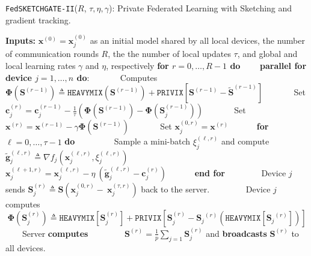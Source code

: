 
\begin{algorithm}[H]
\caption{\texttt{FedSKETCHGATE-II}($R$, $\tau, \eta, \gamma$): Private Federated Learning with Sketching and gradient tracking. }\label{Alg:PFLHet}
\begin{algorithmic}[1]
\State \textbf{Inputs:} $\boldsymbol{x}^{(0)}=\boldsymbol{x}^{(0)}_j$ as an initial  model shared by all local devices, the number of communication rounds $R$, the the number of local updates $\tau$, and global and local learning rates $\gamma$ and $\eta$, respectively
\State \textbf{for $r=0, \ldots, R-1$ do}
\State $\qquad$\textbf{parallel for device $j=1,\ldots,n$ do}:
\State $\qquad\quad$ Computes ${\mathbf{\Phi}}(\mathbf{S}^{(r-1)})\triangleq \texttt{HEAVYMIX}(\mathbf{S}^{(r-1)})+\texttt{PRIVIX}\left[{\mathbf{S}}^{(r-1)}- \tilde{\mathbf{S}}^{(r-1)}\right]$
\State $\qquad\quad$ Set $\mathbf{c}_j^{(r)}=\mathbf{c}_j^{(r-1)}-\frac{1}{\tau}\left(\mathbf{\Phi}\left(\mathbf{S}^{(r-1)}\right)-\mathbf{\Phi}\left(\mathbf{S}^{(r-1)}_{j}\right)\right)$
\State $\qquad\quad$ Set $\boldsymbol{x}^{(r)}=\boldsymbol{x}^{(r-1)}-\gamma\mathbf{\Phi}\left(\mathbf{S}^{(r-1)}\right)$
\State $\qquad\quad$ Set $\boldsymbol{x}_j^{(0,r)}=\boldsymbol{x}^{(r)}$ %
\State $\qquad\quad $\textbf{for} $\ell=0,\ldots,\tau-1$ \textbf{do}
\State $\qquad\quad\quad$ Sample a mini-batch $\xi_j^{(\ell,r)}$ and compute $\tilde{\mathbf{g}}_{j}^{(\ell,r)}\triangleq\nabla{f}_j(\boldsymbol{x}^{(\ell,r)}_j,\xi_j^{(\ell,r)})$
\State $\qquad\quad\quad$ $\boldsymbol{x}^{(\ell+1,r)}_{j}=\boldsymbol{x}^{(\ell,r)}_j-\eta~\left( \tilde{\mathbf{g}}_{j}^{(\ell,r)}-\mathbf{c}_j^{(r)}\right)$ \label{eq:update-rule-alg}
\State $\qquad\quad$\textbf{end for}
\State $\qquad\quad\quad$Device $j$ sends $\mathbf{S}^{(r)}_{j}\triangleq\mathbf{S}\left(\boldsymbol{x}_j^{(0,r)}-~{\boldsymbol{x}}_{j}^{(\tau,r)}\right)$ back to the server.
\State $\qquad\quad\quad$Device $j$ computes $$\mathbf{\Phi}\left(\mathbf{S}^{(r)}_{j}\right)\triangleq \texttt{HEAVYMIX}[\mathbf{S}_j^{(r)}]+\texttt{PRIVIX}\left[{\mathbf{S}}_j^{(r)}- {\mathbf{S}_j}^{(r)}\left(\texttt{HEAVYMIX}[{\mathbf{S}_j}^{(r)}]\right)\right]$$
\State $\qquad$Server \textbf{computes} 
\State $\qquad\qquad {\mathbf{S}}^{(r)}=\frac{1}{p}\sum_{j=1}\mathbf{S}^{(r)}_{j}$ and  \textbf{broadcasts} ${\mathbf{S}}^{(r)}$ to all devices.

\end{algorithmic}
\end{algorithm}

